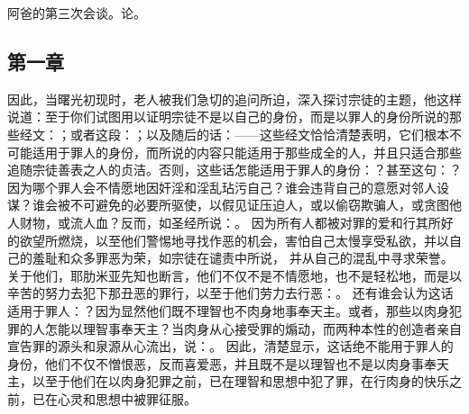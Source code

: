 \par

阿爸的第三次会谈。论。\par


\subsection{第一章}

\par

因此，当曙光初现时，老人被我们急切的追问所迫，深入探讨宗徒的主题，他这样说道：至于你们试图用以证明宗徒不是以自己的身份，而是以罪人的身份所说的那些经文：；或者这段：；以及随后的话：——这些经文恰恰清楚表明，它们根本不可能适用于罪人的身份，而所说的内容只能适用于那些成全的人，并且只适合那些追随宗徒善表之人的贞洁。否则，这些话怎能适用于罪人的身份：？甚至这句：？因为哪个罪人会不情愿地因奸淫和淫乱玷污自己？谁会违背自己的意愿对邻人设谋？谁会被不可避免的必要所驱使，以假见证压迫人，或以偷窃欺骗人，或贪图他人财物，或流人血？反而，如圣经所说：。 因为所有人都被对罪的爱和行其所好的欲望所燃烧，以至他们警惕地寻找作恶的机会，害怕自己太慢享受私欲，并以自己的羞耻和众多罪恶为荣，如宗徒在谴责中所说， 并从自己的混乱中寻求荣誉。关于他们，耶肋米亚先知也断言，他们不仅不是不情愿地，也不是轻松地，而是以辛苦的努力去犯下那丑恶的罪行，以至于他们劳力去行恶：。 还有谁会认为这话适用于罪人：？因为显然他们既不理智也不肉身地事奉天主。或者，那些以肉身犯罪的人怎能以理智事奉天主？当肉身从心接受罪的煽动，而两种本性的创造者亲自宣告罪的源头和泉源从心流出，说：。 因此，清楚显示，这话绝不能用于罪人的身份，他们不仅不憎恨恶，反而喜爱恶，并且既不是以理智也不是以肉身事奉天主，以至于他们在以肉身犯罪之前，已在理智和思想中犯了罪，在行肉身的快乐之前，已在心灵和思想中被罪征服。\par

